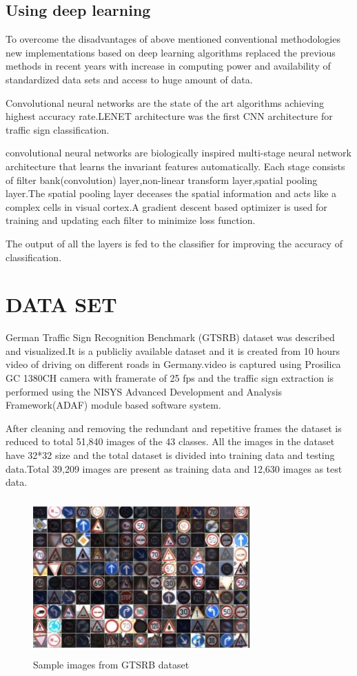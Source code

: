\documentclass[letterpaper, 10 pt, conference]{ieeeconf}  %
\begin{document}
\subsection{Using deep learning}
To overcome the disadvantages of above mentioned conventional methodologies new implementations based on deep learning algorithms replaced the previous methods\cite{8126127} in recent years with increase in computing power and availability of standardized data sets and access to huge amount of data.\par Convolutional neural networks are the state of the art algorithms achieving highest accuracy rate.LENET architecture\cite{stallkamp2012man} was the first CNN architecture for traffic sign classification.\par convolutional neural networks are biologically inspired multi-stage neural network architecture that learns the invariant features automatically.
Each stage consists of filter bank(convolution) layer,non-linear transform layer,spatial pooling layer\cite{DBLP:conf/ijcnn/SermanetL11}.The spatial pooling layer deceases the spatial information and acts like a complex cells in visual cortex.A gradient descent based optimizer is used for training and updating each filter to minimize loss function.\par
The output of all the layers is fed to the classifier for improving the accuracy of classification.
\section{DATA SET}
German Traffic Sign Recognition Benchmark (GTSRB) dataset was described and visualized.It is a publicliy available dataset and it is created from 10 hours video of driving  on different roads in Germany.video is captured using Prosilica GC 1380CH camera with framerate of 25 fps and the traffic sign extraction is performed using the NISYS Advanced Development and Analysis Framework(ADAF)\cite{Houben-IJCNN-2013} module based software system.\par
After cleaning and removing the redundant and repetitive frames the dataset is reduced to total 51,840 images of the 43 classes.
All the images in the dataset have 32*32 size and the total dataset is divided into training data and testing data.Total 39,209 images are present as training data and 12,630 images as test data.
\newline
\newline
\begin{figure}
\includegraphics[width=8.3cm, height=6cm]{dataset}
\caption{Sample images from GTSRB dataset}
\end{figure}
\end{document}
